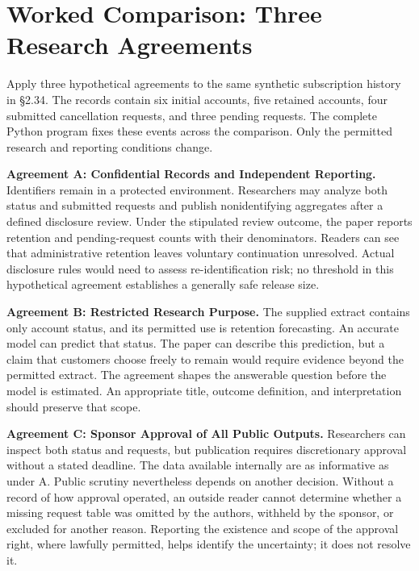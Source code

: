 
\hypertarget{M09-worked-comparison-three-research-agreements}{%
\section{Worked Comparison: Three Research
Agreements}\label{M09-worked-comparison-three-research-agreements}}

\noindent Apply three hypothetical agreements to the same synthetic subscription
history in §2.34. The records contain six initial accounts, five
retained accounts, four submitted cancellation requests, and three
pending requests. The complete Python program fixes these events across
the comparison. Only the permitted research and reporting conditions
change.

\textbf{Agreement A: Confidential Records and Independent Reporting.}
Identifiers remain in a protected environment. Researchers may analyze
both status and submitted requests and publish nonidentifying aggregates
after a defined disclosure review. Under the stipulated review outcome,
the paper reports retention and pending-request counts with their
denominators. Readers can see that administrative retention leaves
voluntary continuation unresolved. Actual disclosure rules would need to
assess re-identification risk; no threshold in this hypothetical
agreement establishes a generally safe release size.

\textbf{Agreement B: Restricted Research Purpose.} The supplied extract
contains only account status, and its permitted use is retention
forecasting. An accurate model can predict that status. The paper can
describe this prediction, but a claim that customers choose freely to
remain would require evidence beyond the permitted extract. The
agreement shapes the answerable question before the model is estimated.
An appropriate title, outcome definition, and interpretation should
preserve that scope.

\textbf{Agreement C: Sponsor Approval of All Public Outputs.}
Researchers can inspect both status and requests, but publication
requires discretionary approval without a stated deadline. The data
available internally are as informative as under A. Public scrutiny
nevertheless depends on another decision. Without a record of how
approval operated, an outside reader cannot determine whether a missing
request table was omitted by the authors, withheld by the sponsor, or
excluded for another reason. Reporting the existence and scope of the
approval right, where lawfully permitted, helps identify the
uncertainty; it does not resolve it.

